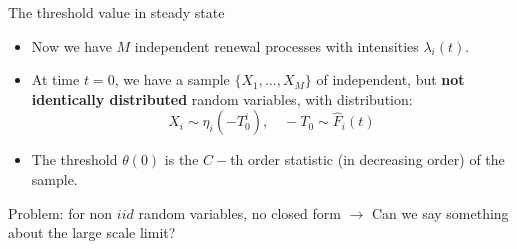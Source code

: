 \documentclass[aspectratio=169]{beamer}
\newcommand{\ind}[1]{\mathbf{1}_{#1}}
\newenvironment*{myitem}[1][1.5em]{\begin{itemize}\setlength{\itemsep}{#1}}{\end{itemize}}
\begin{document}
\begin{frame}{The threshold value in steady state}
	
	\begin{myitem}[1em]
		\item Now we have $M$ independent renewal processes with intensities $\lambda_i(t)$.
		\item At time $t=0$, we have a sample $\{X_1,\ldots,X_M\}$ of independent, but \textbf{not identically distributed} random variables, with distribution:
		\begin{equation*}
			X_i \sim \eta_i(-T_0^i), \quad -T_0\sim \hat{F}_i(t) 
		\end{equation*}

		\item The threshold $\theta(0)$ is the $C-$th \alert{order statistic} (in decreasing order) of the sample.
	\end{myitem}
	\vfill
	\alert{Problem:} for non $iid$ random variables, no closed form $\to$ Can we say something about the large scale limit?
\end{frame}

	
	
\end{document}
